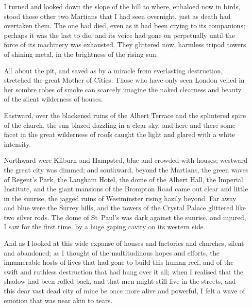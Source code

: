 I turned and looked down the slope of the hill to where, enhaloed now in birds, stood those other two Martians that I had seen overnight, just as death had overtaken them. The one had died, even as it had been crying to its companions; perhaps it was the last to die, and its voice had gone on perpetually until the force of its machinery was exhausted. They glittered now, harmless tripod towers of shining metal, in the brightness of the rising sun.



All about the pit, and saved as by a miracle from everlasting destruction, stretched the great Mother of Cities. Those who have only seen London veiled in her sombre robes of smoke can scarcely imagine the naked clearness and beauty of the silent wilderness of houses.

Eastward, over the blackened ruins of the Albert Terrace and the splintered spire of the church, the sun blazed dazzling in a clear sky, and here and there some facet in the great wilderness of roofs caught the light and glared with a white intensity.

Northward were Kilburn and Hampsted, blue and crowded with houses; westward the great city was dimmed; and southward, beyond the Martians, the green waves of Regent's Park, the Langham Hotel, the dome of the Albert Hall, the Imperial Institute, and the giant mansions of the Brompton Road came out clear and little in the sunrise, the jagged ruins of Westminster rising hazily beyond. Far away and blue were the Surrey hills, and the towers of the Crystal Palace glittered like two silver rods. The dome of St~Paul's was dark against the sunrise, and injured, I saw for the first time, by a huge gaping cavity on its western side.

And as I looked at this wide expanse of houses and factories and churches, silent and abandoned; as I thought of the multitudinous hopes and efforts, the innumerable hosts of lives that had gone to build this human reef, and of the swift and ruthless destruction that had hung over it all; when I realised that the shadow had been rolled back, and that men might still live in the streets, and this dear vast dead city of mine be once more alive and powerful, I felt a wave of emotion that was near akin to tears.



